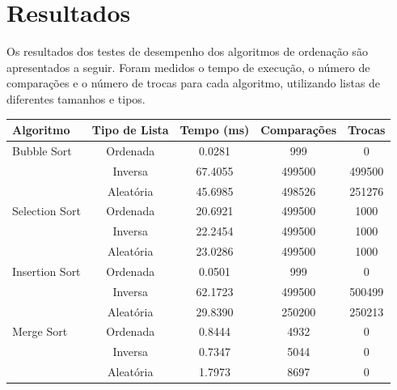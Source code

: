 \documentclass[tcc2]{uftex}
\begin{document}
\chapter{Resultados}

Os resultados dos testes de desempenho dos algoritmos de ordenação são apresentados a seguir. Foram medidos o tempo de execução, o número de comparações e o número de trocas para cada algoritmo, utilizando listas de diferentes tamanhos e tipos.

\begin{table}[h]
\centering
\label{tab:resultados}
\begin{tabular}{|l|c|c|c|c|}
\hline
\textbf{Algoritmo} & \textbf{Tipo de Lista} & \textbf{Tempo (ms)} & \textbf{Comparações} & \textbf{Trocas} \\ \hline
Bubble Sort       & Ordenada                & 0.0281                & 999                & 0   \\ \cline{2-5}
                   & Inversa                 & 67.4055                & 499500                & 499500   \\ \cline{2-5}
                   & Aleatória               & 45.6985                & 498526                 & 251276   \\ \hline
Selection Sort    & Ordenada                & 20.6921                 & 499500                 & 1000   \\ \cline{2-5}
                   & Inversa                 & 22.2454                 & 499500                 & 1000   \\ \cline{2-5}
                   & Aleatória               & 23.0286                 & 499500                 & 1000   \\ \hline
Insertion Sort    & Ordenada                & 0.0501                 & 999                 & 0   \\ \cline{2-5}
                   & Inversa                 & 62.1723                 & 499500                 & 500499   \\ \cline{2-5}
                   & Aleatória               & 29.8390                 & 250200                 & 250213   \\ \hline
Merge Sort        & Ordenada                & 0.8444                 & 4932                 & 0    \\ \cline{2-5}
                   & Inversa                 & 0.7347                 & 5044                 & 0    \\ \cline{2-5}
                   & Aleatória               & 1.7973                 & 8697                 & 0    \\ \hline

\end{tabular}
\end{table}
\end{document}

